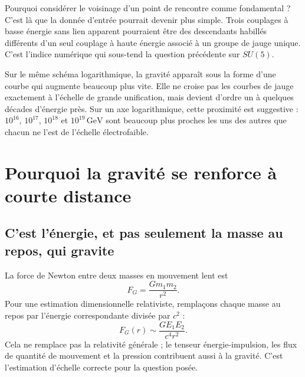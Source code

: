 Pourquoi considérer le voisinage d’un point de rencontre comme fondamental ? C’est là que la donnée d’entrée pourrait devenir plus simple. Trois couplages à basse énergie sans lien apparent pourraient être des descendants habillés différents d’un seul couplage à haute énergie associé à un groupe de jauge unique. C’est l’indice numérique qui sous-tend la question précédente sur \(SU(5)\).

Sur le même schéma logarithmique, la gravité apparaît sous la forme d’une courbe qui augmente beaucoup plus vite. Elle ne croise pas les courbes de jauge exactement à l’échelle de grande unification, mais devient d’ordre un à quelques décades d’énergie près. Sur un axe logarithmique, cette proximité est suggestive : \(10^{16}\), \(10^{17}\), \(10^{18}\) et \(10^{19}\,\mathrm{GeV}\) sont beaucoup plus proches les uns des autres que chacun ne l’est de l’échelle électrofaible.

\section{Pourquoi la gravité se renforce à courte distance}

\subsection{C’est l’énergie, et pas seulement la masse au repos, qui gravite}

La force de Newton entre deux masses en mouvement lent est
\begin{equation}
  F_G=\frac{Gm_1m_2}{r^2}.
  \label{eq:l10-newton-force}
\end{equation}
Pour une estimation dimensionnelle relativiste, remplaçons chaque masse au repos par l’énergie correspondante divisée par \(c^2\) :
\begin{equation}
  F_G(r)\sim\frac{GE_1E_2}{c^4r^2}.
  \label{eq:l10-relativistic-gravity-force}
\end{equation}
Cela ne remplace pas la relativité générale ; le tenseur énergie-impulsion, les flux de quantité de mouvement et la pression contribuent aussi à la gravité. C’est l’estimation d’échelle correcte pour la question posée.

